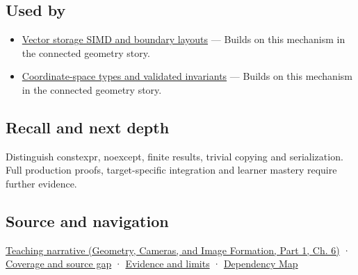 \subsection{Used by}\label{appendix-37a39984ba66-used-by}

\hypertarget{appendix-37a39984ba66-used-by}{}

\begin{itemize}
\tightlist
\item
  \hyperref[appendix-26bf6bf2fb8b]{Vector storage SIMD and boundary layouts} --- Builds on this mechanism in the connected geometry story.
\item
  \hyperref[appendix-380a220e2529]{Coordinate-space types and validated invariants} --- Builds on this mechanism in the connected geometry story.
\end{itemize}

\subsection{Recall and next depth}\label{appendix-37a39984ba66-recall-and-next-depth}

\hypertarget{appendix-37a39984ba66-recall-and-next-depth}{}

Distinguish constexpr, noexcept, finite results, trivial copying and serialization. Full production proofs, target-specific integration and learner mastery require further evidence.

\subsection{Source and navigation}\label{appendix-37a39984ba66-source-and-navigation}

\hypertarget{appendix-37a39984ba66-source-and-navigation}{}

\href{../03-Geometry-Cameras-and-Image-Formation-P01/main.pdf\#nameddest=02-foundations-ii-ch037-three-stored-numbers-are-not-the-complete-contract}{Teaching narrative (Geometry, Cameras, and Image Formation, Part 1, Ch. 6)} · \hyperref[appendix-fd090d982a15-phase-6---parts-501-600]{Coverage and source gap} · \hyperref[appendix-a103e7846d21-phase-6---source-analysis-and-verification]{Evidence and limits} · \hyperref[appendix-4ad47bdd269a]{Dependency Map}
